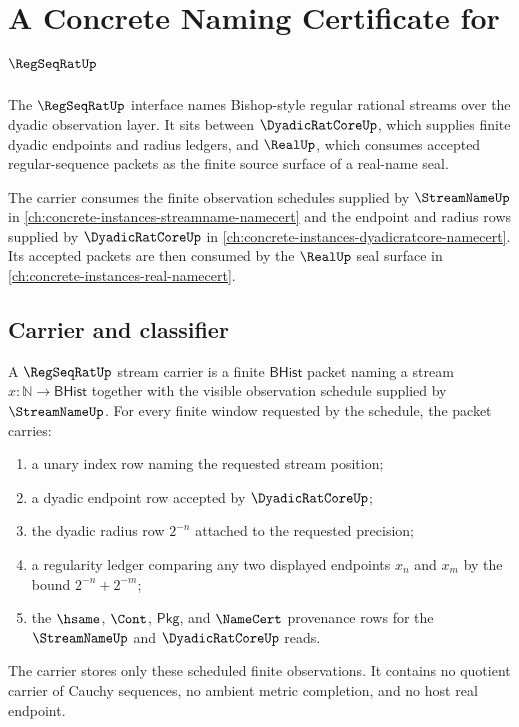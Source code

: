 \chapter{A Concrete Naming Certificate for $\RegSeqRatUp$}
\label{ch:concrete-instances-regseqrat-namecert}

The $\RegSeqRatUp$ interface names Bishop-style regular rational streams over the dyadic observation layer. It sits between $\DyadicRatCoreUp$, which supplies finite dyadic endpoints and radius ledgers, and $\RealUp$, which consumes accepted regular-sequence packets as the finite source surface of a real-name seal.

The carrier consumes the finite observation schedules supplied by $\StreamNameUp$ in \autoref{ch:concrete-instances-streamname-namecert} and the endpoint and radius rows supplied by $\DyadicRatCoreUp$ in \autoref{ch:concrete-instances-dyadicratcore-namecert}. Its accepted packets are then consumed by the $\RealUp$ seal surface in \autoref{ch:concrete-instances-real-namecert}.

\section{Carrier and classifier}
\label{sec:regseqrat-carrier-classifier}

\begin{definition}
\label{def:regseqrat-stream-carrier}
A $\RegSeqRatUp$ stream carrier is a finite $\mathsf{BHist}$ packet naming a stream $x:\mathbb{N}\to\mathsf{BHist}$ together with the visible observation schedule supplied by $\StreamNameUp$. For every finite window requested by the schedule, the packet carries:
\begin{enumerate}
\item a unary index row naming the requested stream position;
\item a dyadic endpoint row accepted by $\DyadicRatCoreUp$;
\item the dyadic radius row $2^{-n}$ attached to the requested precision;
\item a regularity ledger comparing any two displayed endpoints $x_n$ and $x_m$ by the bound $2^{-n}+2^{-m}$;
\item the $\hsame$, $\Cont$, $\mathsf{Pkg}$, and $\NameCert$ provenance rows for the $\StreamNameUp$ and $\DyadicRatCoreUp$ reads.
\end{enumerate}
The carrier stores only these scheduled finite observations. It contains no quotient carrier of Cauchy sequences, no ambient metric completion, and no host real endpoint.
\end{definition}

